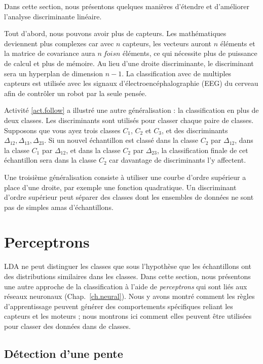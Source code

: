 Dans cette section, nous présentons quelques manières d'étendre et d'améliorer l'analyse discriminante linéaire.

Tout d'abord, nous pouvons avoir plus de capteurs. Les mathématiques deviennent plus complexes car avec $n$ capteurs, les vecteurs auront $n$ éléments et la matrice de covariance aura $n\ fois n$ éléments, ce qui nécessite plus de puissance de calcul et plus de mémoire. Au lieu d'une droite discriminante, le discriminant sera un hyperplan de dimension $n-1$. La classification avec de multiples capteurs est utilisée avec les signaux d'électroencéphalographie (EEG) du cerveau afin de contrôler un robot par la seule pensée.

Activité \ref{act.follow} a illustré une autre généralisation : la classification en plus de deux classes. Les discriminants sont utilisés pour classer chaque paire de classes. Supposons que vous ayez trois classes $C_1$, $C_2$ et $C_3$, et des discriminants $\Delta_{12}, \Delta_{13}, \Delta_{23}$. Si un nouvel échantillon est classé dans la classe $C_2$ par $\Delta_{12}$, dans la classe $C_1$ par $\Delta_{12}$, et dans la classe $C_2$ par $\Delta_{23}$, la classification finale de cet échantillon sera dans la classe $C_2$ car davantage de discriminants l'y affectent.

Une troisième généralisation consiste à utiliser une courbe d'ordre supérieur a place d'une droite, par exemple une fonction quadratique. Un discriminant d'ordre supérieur peut séparer des classes dont les ensembles de données ne sont pas de simples amas d'échantillons.

\section{Perceptrons}\label{s.perceptrons}

LDA ne peut distinguer les classes que sous l'hypothèse que les échantillons ont des distributions similaires dans les classes. Dans cette section, nous présentons une autre approche de la classification à l'aide de \emph{perceptrons} qui sont liés aux réseaux neuronaux (Chap.~\ref{ch.neural}). Nous y avons montré comment les règles d'apprentissage peuvent générer des comportements spécifiques reliant les capteurs et les moteurs ; nous montrons ici comment elles peuvent être utilisées pour classer des données dans de classes.

\subsection{Détection d'une pente}\label{s.detect-slope}

